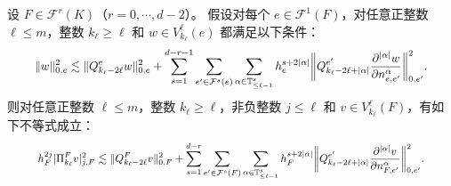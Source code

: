 \begin{lemma}
设 $F\in\mathcal F^r(K)$（$r=0,\cdots, d-2$）。
假设对每个 $e\in \mathcal F^1(F)$，对任意正整数 $\ell\leq m$，整数 $k_{\ell}\geq\ell$ 和 $w\in V_{k_{\ell}}^{\ell}(e)$ 都满足以下条件：
\begin{equation}\label{eq:20210420}
\resizebox{0.915\textwidth}{!}{$\displaystyle
\|w\|_{0,e}^2\lesssim \|Q_{k_{\ell}-2\ell}^ew\|_{0,e}^2
+ \sum_{s=1}^{d-r-1}\sum_{e'\in\mathcal F^{s}(e)}\sum_{\alpha\in
\mathbb{T}^{s}_{\leq \ell-1}}h_e^{s+2|\alpha|}\bigg\|Q_{k_{\ell}-2\ell+|\alpha|}^{e'}\frac{\partial^{|\alpha|}w}{\partial \nnn_{e,e'}^{\alpha}}\bigg\|_{0,e'}^2.
$}
\end{equation}
则对任意正整数 $\ell\leq m$，整数 $k_{\ell}\geq\ell$，非负整数 $j\leq \ell$ 和 $v\in V_{k_{\ell}}^{\ell}(F)$，有如下不等式成立：
\begin{equation}\label{eq:20210421-4}
\resizebox{0.9\textwidth}{!}{$\displaystyle
h_F^{2j}|\Pi_{k_{\ell}}^Fv|_{j,F}^2\lesssim \|Q_{k_{\ell}-2\ell}^Fv\|_{0,F}^2
+ \sum_{s=1}^{d-r}\sum_{e'\in\mathcal F^{s}(F)}\sum_{\alpha\in
\mathbb{T}^{s}_{\leq \ell-1}}h_F^{s+2|\alpha|}\bigg\|Q_{k_{\ell}-2\ell+|\alpha|}^{e'}\frac{\partial^{|\alpha|}v}{\partial \nnn_{F,e'}^{\alpha}}\bigg\|_{0,e'}^2.
$}
\end{equation}
\end{lemma}

